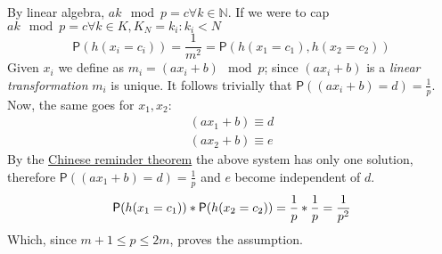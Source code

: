 \documentclass{article}
\newcommand*{\prob}{\mathsf{P}}    %
\begin{document}
By linear algebra, $ak \mod p = c \forall k \in \mathbb{N}$.
If we were to cap $ak \mod p = c \forall k \in K, K_{N} = {k_{i}: k_{i} < N}$
\begin{equation}
\prob(h(x_{i} = c_{i})) = \frac{1}{m^{2}} = \prob(h(x_{1} = c_{1}), h(x_{2} = c_{2}))
\end{equation}
Given $x_{i}$ we define as $m_{i} = (a x_{i} + b) \mod p$; since $(a x_{i} + b)$
is a \emph{linear transformation} $m_{i}$ is unique.
It follows trivially that $\prob((a x_{i} + b) = d) = \frac{1}{p}$.
Now, the same goes for $x_{1}, x_{2}$:
    \begin{gather}
    (a x_{1} + b) \equiv d                                                           \\
    (a x_{2} + b) \equiv e
    \end{gather}
By the \href{http://en.wikipedia.org/wiki/Chinese_remainder_theorem}{Chinese reminder theorem}
the above system has only one solution, therefore $\prob((a x_{1} + b) = d) = \frac{1}{p}$ and
$e$ become independent of $d$.
\begin{equation}
    \begin{equation}
    \prob(h(x_{1} = c_{1})) * \prob(h(x_{2} = c_{2})) =\frac{1}{p} * \frac{1}{p} = \frac{1}{p^{2}}
\end{equation}
Which, since $m + 1 \leq p \leq 2m$, proves the assumption.
\end{document}
